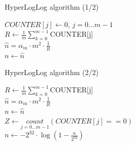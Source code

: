 \documentclass[10pt]{beamer}
\begin{document}
\begin{frame}{HyperLogLog algorithm (1/2)}
  \begin{algorithm}[H]
    \DontPrintSemicolon
    \caption[]{Estimatin cardinality with \textit{HyperLogLog}}
    $COUNTER[j] \gets $0, $j = 0...m - 1$\\
    $R \gets \frac{1}{m} \sum\limits_{k=0}^{m-1}$COUNTER[j] \\
    $\hat{n} = \alpha_m \cdot m^2 \cdot \frac{1}{R}$ \\
    $n \gets \hat{n}$ \\

\end{algorithm}
\end{frame}
\begin{frame}{HyperLogLog algorithm (2/2)}
  \begin{algorithm}[H]
    \DontPrintSemicolon
    \LinesNumberedHidden

    $R \gets \frac{1}{m} \sum\limits_{k=0}^{m-1}$COUNTER[j] \\
    $\hat{n} = \alpha_m \cdot m^2 \cdot \frac{1}{R}$ \\
    $n \gets \hat{n}$ \\
    {
        $Z \gets \underset{j=0...m-1}{count}\left(COUNTER[j] == 0\right)$\\
    }
    {
        $n \gets -2^{32}\cdot\log\left(1-\frac{n}{2^{32}}\right)$
    }
\end{algorithm}
\end{frame}
\end{document}
